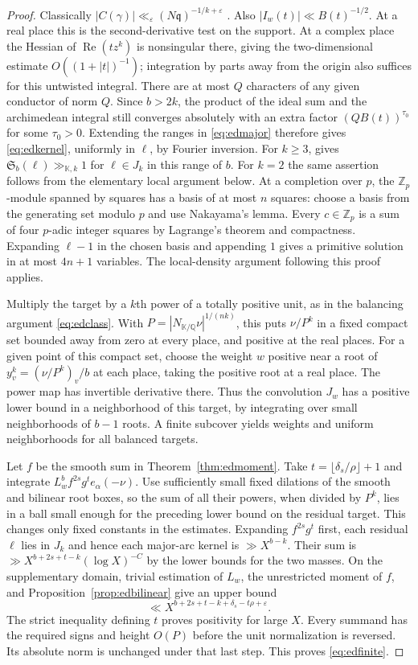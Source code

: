 \documentclass[11pt,letterpaper]{article}
\theoremstyle{definition}
\numberwithin{equation}{section}
\begin{document}
\begin{proof}
Classically $|C(\gamma)|\ll_\varepsilon
(N\mathfrak q)^{-1/k+\varepsilon}$ \cite[pp.~38--39]{htat73}.
Also $|I_w(t)|\ll B(t)^{-1/2}$. At a real place this is the
second-derivative test on the support. At a complex place the Hessian
of $\operatorname{Re}(t z^k)$ is nonsingular there, giving the
two-dimensional estimate $O((1+|t|)^{-1})$; integration by parts
away from the origin also suffices for this untwisted integral.
There are at most $Q$ characters of any given conductor of norm $Q$.
Since $b>2k$, the product of the ideal sum and the archimedean
integral still converges absolutely with an extra factor
$(QB(t))^{\tau_0}$ for some $\tau_0>0$. Extending the ranges in
\eqref{eq:edmajor} therefore gives \eqref{eq:edkernel}, uniformly
in $\ell$, by Fourier inversion. For $k\ge3$, \cite[Theorem~2]{htat73} gives
$\mathfrak S_b(\ell)\gg_{\mathbb K,k}1$ for $\ell\in J_k$ in this
range of $b$. For $k=2$ the same assertion follows from the elementary
local argument below. At a completion over $p$, the $\mathbb Z_p$-module
spanned by squares has a basis of at most $n$ squares: choose a basis
from the generating set modulo $p$ and use Nakayama's lemma.
Every $c\in\mathbb Z_p$ is a sum of four $p$-adic integer squares by
Lagrange's theorem and compactness. Expanding $\ell-1$ in the chosen
basis and appending $1$ gives a primitive solution in at most $4n+1$
variables. The local-density argument following this proof applies.

Multiply the target by a $k$th power of a totally positive unit, as
in the balancing argument \eqref{eq:edclass}. With
$P=|N_{\mathbb K/\mathbb Q}\nu|^{1/(nk)}$, this puts $\nu/P^k$
in a fixed compact set bounded away from zero at every place, and
positive at the real places. For a given point of this compact set,
choose the weight $w$ positive near a root of $y_v^k=(\nu/P^k)_v/b$
at each place, taking the positive root at a real place. The power map has invertible derivative there. Thus the
convolution $J_w$ has a positive lower bound in a neighborhood of
this target, by integrating over small neighborhoods of $b-1$ roots.
A finite subcover yields weights and uniform neighborhoods for all
balanced targets.

Let $f$ be the smooth sum in Theorem~\ref{thm:edmoment}. Take
$t=\lfloor\delta_s/\rho\rfloor+1$ and integrate
$L_w^b f^{2s}g^t e_\alpha(-\nu)$. Use sufficiently small fixed
dilations of the smooth and bilinear root boxes, so the sum of all
their powers, when divided by $P^k$, lies in a ball small enough for
the preceding lower bound on the residual target. This changes only
fixed constants in the estimates. Expanding $f^{2s}g^t$ first, each
residual $\ell$ lies in $J_k$ and hence each major-arc kernel is
$\gg X^{b-k}$. Their sum is
$\gg X^{b+2s+t-k}(\log X)^{-C}$ by the lower bounds for the two
masses. On the supplementary domain, trivial estimation of $L_w$,
the unrestricted moment of $f$, and Proposition~\ref{prop:edbilinear}
give an upper bound
\[
                 \ll X^{b+2s+t-k+\delta_s-t\rho+\varepsilon}.
\]
The strict inequality defining $t$ proves positivity for large $X$.
Every summand has the required signs and height $O(P)$ before the unit
normalization is reversed. Its absolute norm is unchanged under
that last step. This proves \eqref{eq:edfinite}.


\end{proof}
\end{document}

